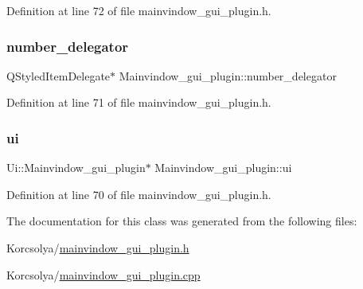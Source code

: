 Definition at line 72 of file mainvindow\+\_\+gui\+\_\+plugin.\+h.

\mbox{\label{classMainvindow__gui__plugin_a1ae497c20498fc8347d6d8c7691a4220}} 
\subsubsection{\texorpdfstring{number\+\_\+delegator}{number\_delegator}}
{\footnotesize\ttfamily Q\+Styled\+Item\+Delegate$\ast$ Mainvindow\+\_\+gui\+\_\+plugin\+::number\+\_\+delegator\hspace{0.3cm}{\ttfamily [private]}}



Definition at line 71 of file mainvindow\+\_\+gui\+\_\+plugin.\+h.

\mbox{\label{classMainvindow__gui__plugin_a86399ba5cca2bb2ab811afc6dd47ccc8}} 
\subsubsection{\texorpdfstring{ui}{ui}}
{\footnotesize\ttfamily Ui\+::\+Mainvindow\+\_\+gui\+\_\+plugin$\ast$ Mainvindow\+\_\+gui\+\_\+plugin\+::ui\hspace{0.3cm}{\ttfamily [private]}}



Definition at line 70 of file mainvindow\+\_\+gui\+\_\+plugin.\+h.



The documentation for this class was generated from the following files\+:\begin{DoxyCompactItemize}
\item 
Korcsolya/\hyperlink{mainvindow__gui__plugin_8h}{mainvindow\+\_\+gui\+\_\+plugin.\+h}\item 
Korcsolya/\hyperlink{mainvindow__gui__plugin_8cpp}{mainvindow\+\_\+gui\+\_\+plugin.\+cpp}\end{DoxyCompactItemize}
